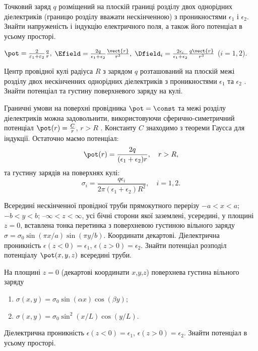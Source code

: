 \begin{problem}
Точковий заряд $q$ розміщений на плоскій границі розділу двох однорідних  діелектриків (границю розділу вважати нескінченною) з проникностями $\epsilon_{1}$ і $\epsilon_{2}$. Знайти напруженість і індукцію електричного поля, а також його потенціал в усьому просторі.
\begin{solution}
	$
		\pot  = \frac{2}{{{\varepsilon _1} + {\varepsilon _2}}}\frac{q}{r},
	$
	$
		\Efield = \frac{2q}{\epsilon_1 + \epsilon_2}\frac{\vect{r}}{r^3},
	$
	$ \Dfield_i = \frac{2\epsilon_i}{\epsilon_1 + \epsilon_2}\frac{q\vect{r}}{r^3} $ ($i = 1,2$).
\end{solution}
\end{problem}


\begin{problem}
Центр провідної кулі радіуса $R$  з зарядом $q$  розташований на плоскій межі розділу двох нескінченних однорідних діелектриків з проникностями $\epsilon_1$ та $\epsilon_2$ . Знайти потенціал та густину поверхневого заряду на кулі.
\begin{solution}
	Граничні умови на поверхні провідника $\pot = \const$  та межі розділу діелектриків можна задовольнити, використовуючи сферично-симетричний потенціал  $\pot(r) = \frac{C}{r}$, $r > R$ . Константу $C$ знаходимо з теореми Гаусса для індукції. Остаточно маємо потенціал:
	\[
		\pot(r) = \frac{2q}{(\epsilon_1 + \epsilon_2)r}, \quad r > R,
	\]
	та густину зарядів на поверхнях кулі:
	\[
		\sigma_i = \frac{q\epsilon_i}{2\pi(\epsilon_1 + \epsilon_2)R^2}, \quad i = 1,2.
	\]
\end{solution}
\end{problem}

\begin{problem}
Всередині нескінченної провідної труби прямокутного перерізу $-a<x<a$; $-b<y<b$; $–\infty<z<\infty$, усі бічні сторони якої заземлені, усередині, у площині $z=0$, вставлена тонка перетинка з поверхневою густиною вільного заряду $\sigma  = \sigma _0\sin (\pi x/a)\sin (\pi y/b)$. Координати декартові. Діелектрична проникність  $\epsilon (z < 0) = \epsilon _1$, $\epsilon (z > 0) = \epsilon _2$. Знайти потенціал розподіл потенціалу $\pot(x,y,z)$ всередині труби.
\end{problem}

\begin{problem}
На площині $z=0$ (декартові координати $x$,$y$,$z$) поверхнева густина вільного заряду
\begin{enumerate}[label=\alph*)]
	\item $\sigma (x,y) = \sigma _0\sin (\alpha x)\cos (\beta y)$;
	\item $\sigma (x,y) = {\sigma _0}{\sin ^2}(x/L)\cos (y/L)$.
\end{enumerate}
Діелектрична проникність  $\epsilon (z < 0) = \epsilon _1$, $\epsilon (z > 0) = \epsilon _2$. Знайти потенціал в усьому просторі.
\end{problem}

